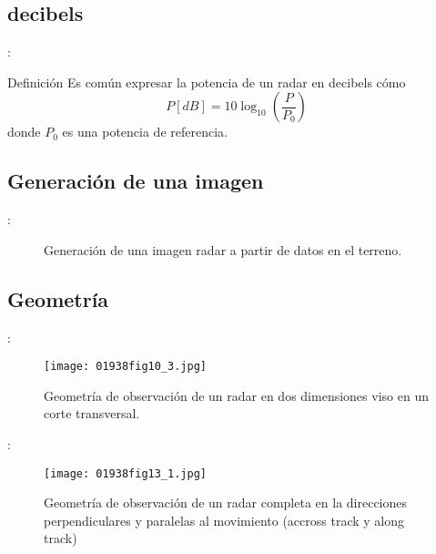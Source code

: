 \subsection{decibels}
\begin{frame}{\secname : \subsecname}
    \begin{block}{Definición}
      Es común expresar la potencia de un radar en decibels cómo
      \begin{equation}
        P [dB] = 10\log_{10}\left( \frac{P}{P_0}\right)
      \end{equation}
      donde $P_0$ es una potencia de referencia.
    \end{block}
\end{frame}

\subsection{Generación de una imagen}
\begin{frame}{\secname : \subsecname}
  \begin{figure}
    \centering
    \caption{Generación de una imagen radar a partir de datos en el terreno.}
    \label{}
  \end{figure}
\end{frame}

\subsection{Geometría}
\begin{frame}{\secname : \subsecname}
  \begin{figure}
    \centering
    \texttt{[image: 01938fig10\_3.jpg]}
    \caption{Geometría de observación de un radar en dos dimensiones viso en un corte transversal.}
    \label{}
  \end{figure}
\end{frame}

\begin{frame}{\secname : \subsecname}
  \begin{figure}
    \centering
    \texttt{[image: 01938fig13\_1.jpg]}
    \caption{Geometría de observación de un radar completa en la direcciones perpendiculares y paralelas al movimiento (accross track y along track)}
    \label{}
  \end{figure}
\end{frame}


